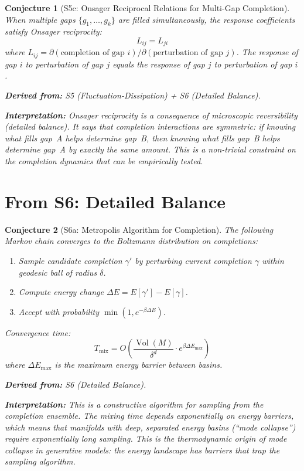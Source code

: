 \documentclass[11pt,letterpaper]{article}
\newtheorem{conjecture}{Conjecture}[section]
\newcommand{\Vol}{\operatorname{Vol}}
\begin{document}
\begin{conjecture}[S5c: Onsager Reciprocal Relations for 
Multi-Gap Completion]\label{conj:onsager}
When multiple gaps $\{g_1, \ldots, g_k\}$ are filled simultaneously, 
the response coefficients satisfy Onsager reciprocity:
\begin{equation}
    L_{ij} = L_{ji}
\end{equation}
where $L_{ij} = \partial (\text{completion of gap } i) / 
\partial (\text{perturbation of gap } j)$. The response of gap $i$ 
to perturbation of gap $j$ equals the response of gap $j$ to 
perturbation of gap $i$.

\textbf{Derived from:} S5 (Fluctuation-Dissipation) + S6 
(Detailed Balance).

\textbf{Interpretation:} Onsager reciprocity is a consequence of 
microscopic reversibility (detailed balance). It says that completion 
interactions are symmetric: if knowing what fills gap~A helps determine 
gap~B, then knowing what fills gap~B helps determine gap~A by exactly 
the same amount. This is a non-trivial constraint on the completion 
dynamics that can be empirically tested.
\end{conjecture}

\newpage
\section{From S6: Detailed Balance}

\begin{conjecture}[S6a: Metropolis Algorithm for 
Completion]\label{conj:metropolis}
The following Markov chain converges to the Boltzmann distribution on 
completions:

\begin{enumerate}[label=\arabic*.]
    \item Sample candidate completion $\gamma'$ by perturbing current 
    completion $\gamma$ within geodesic ball of radius $\delta$.
    \item Compute energy change $\Delta E = E[\gamma'] - E[\gamma]$.
    \item Accept with probability $\min(1, e^{-\beta \Delta E})$.
\end{enumerate}

Convergence time:
\begin{equation}
    T_{\mathrm{mix}} = O\left(\frac{\Vol(M)}{\delta^d} \cdot 
    e^{\beta \Delta E_{\max}}\right)
\end{equation}
where $\Delta E_{\max}$ is the maximum energy barrier between basins.

\textbf{Derived from:} S6 (Detailed Balance).

\textbf{Interpretation:} This is a constructive algorithm for sampling 
from the completion ensemble. The mixing time depends exponentially on 
energy barriers, which means that manifolds with deep, separated energy 
basins (``mode collapse'') require exponentially long sampling. This 
is the thermodynamic origin of mode collapse in generative models: 
the energy landscape has barriers that trap the sampling algorithm.
\end{conjecture}
\end{document}

